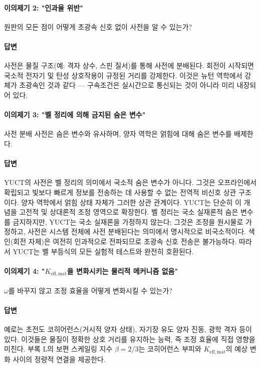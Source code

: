 \documentclass[12pt,a4paper]{article}
\newcommand{\betaf}{\beta}
\begin{document}
	\paragraph{이의제기 2: "인과율 위반"}
	원판의 모든 점이 어떻게 초광속 신호 없이 사전을 알 수 있는가?
	
	\paragraph{답변}
	사전은 물질 구조(예: 격자 상수, 스핀 질서)를 통해 사전에 분배된다. 회전이 시작되면 국소적 전자기 및 탄성 상호작용이 규정된 거리를 강제한다. 이것은 뉴턴 역학에서 강체가 초광속인 것과 같다 — 구속조건은 실시간으로 통신되는 것이 아니라 미리 내장되어 있다.
	
	\paragraph{이의제기 3: "벨 정리에 의해 금지된 숨은 변수"}
	사전 분배 사전은 숨은 변수와 유사하며, 양자 역학은 얽힘에 대해 숨은 변수를 배제한다.
	
	\paragraph{답변}
	YUCT의 사전은 벨 정리의 의미에서 국소적 숨은 변수가 아니다. 그것은 오프라인에서 확립되고 빛보다 빠르게 정보를 전송하는 데 사용할 수 없는 전역적 비신호 상관 구조이다. 양자 역학에서 얽힘 상태 자체가 그러한 상관 관계이다. YUCT는 단순히 이 개념을 고전적 및 상대론적 조정 영역으로 확장한다. 벨 정리는 국소 실재론적 숨은 변수를 금지하지만, YUCT는 국소 실재론을 가정하지 않는다; 그것은 조정을 원시물로 가정하고, 사전은 시스템 전체에 사전 분배된다는 의미에서 명시적으로 비국소적이다. 색인(회전 자체)은 여전히 인과적으로 전파되므로 초광속 신호 전송은 불가능하다. 따라서 YUCT는 벨 부등식의 모든 실험적 테스트와 완전히 호환된다.
	
	\paragraph{이의제기 4: "\(K_{\mathrm{eff,mat}}\)을 변화시키는 물리적 메커니즘 없음"}
	\(\omega\)를 바꾸지 않고 조정 효율을 어떻게 변화시킬 수 있는가?
	
	\paragraph{답변}
	예로는 초전도 코히어런스(거시적 양자 상태), 자기장 유도 양자 진동, 광학 격자 등이 있다. 이것들은 물질이 정확한 상호 거리를 유지하는 능력, 즉 조정 효율에 직접 영향을 미친다. 부록 L의 보편 스케일링 지수 \(\betaf = 2/3\)는 코히어런스 부피와 \(K_{\mathrm{eff,mat}}\)의 예상 변화 사이의 정량적 연결을 제공한다.
	
\end{document}
